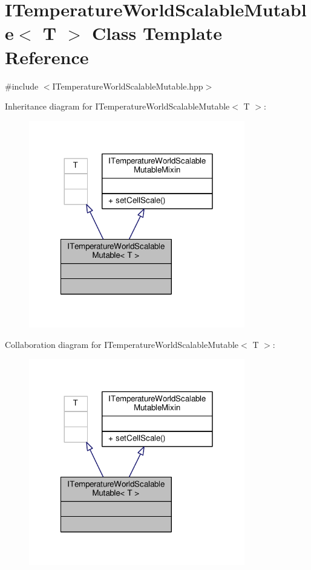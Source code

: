 \hypertarget{class_i_temperature_world_scalable_mutable}{\section{I\-Temperature\-World\-Scalable\-Mutable$<$ T $>$ Class Template Reference}
\label{class_i_temperature_world_scalable_mutable}
}


{\ttfamily \#include $<$I\-Temperature\-World\-Scalable\-Mutable.\-hpp$>$}



Inheritance diagram for I\-Temperature\-World\-Scalable\-Mutable$<$ T $>$\-:
\nopagebreak
\begin{figure}[H]
\begin{center}
\leavevmode
\includegraphics[width=267pt]{class_i_temperature_world_scalable_mutable__inherit__graph}
\end{center}
\end{figure}


Collaboration diagram for I\-Temperature\-World\-Scalable\-Mutable$<$ T $>$\-:
\nopagebreak
\begin{figure}[H]
\begin{center}
\leavevmode
\includegraphics[width=267pt]{class_i_temperature_world_scalable_mutable__coll__graph}
\end{center}
\end{figure}
